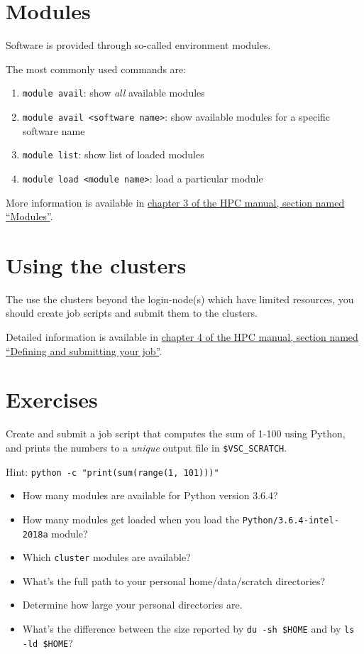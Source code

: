 \section{Modules}

Software is provided through so-called environment \gls{modules}.

The most commonly used commands are:

\begin{enumerate}
 \item \lstinline|module avail|: show \emph{all} available modules
 \item \lstinline|module avail <software name>|: show available modules for a specific software name
 \item \lstinline|module list|: show list of loaded modules
 \item \lstinline|module load <module name>|: load a particular module
\end{enumerate}

More information is available in
\href{\HPCManualURL#sec:modules}{chapter 3 of the HPC manual, section named ``Modules''}.

\section{Using the clusters}

The use the clusters beyond the \gls{login-node}(s) which have limited resources, you
should create job scripts and submit them to the clusters.

Detailed information is available in
\href{\HPCManualURL#sec:defining-and-submitting-job}{chapter 4 of the HPC manual, section named ``Defining and submitting your job''}.

\section{Exercises}

Create and submit a job script that computes the sum of 1-100 using Python, and
prints the numbers to a \emph{unique} output file in \lstinline|$VSC_SCRATCH|.

Hint: \lstinline|python -c "print(sum(range(1, 101)))"|

\begin{itemize}
    \item How many modules are available for Python version 3.6.4?
    \item How many modules get loaded when you load the \lstinline|Python/3.6.4-intel-2018a|
        module?
    \item Which \lstinline|cluster| modules are available?
\end{itemize}

\begin{itemize}
    \item What's the full path to your personal home/data/scratch directories?
    \item Determine how large your personal directories are.
    \item What's the difference between the size reported by \lstinline|du -sh $HOME|
        and by \lstinline|ls -ld $HOME|?
\end{itemize}
